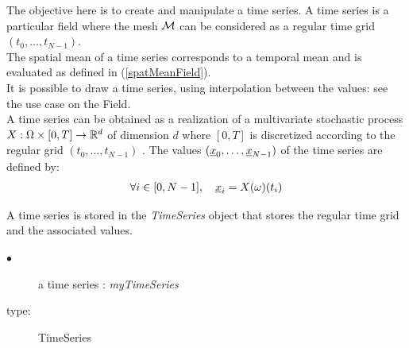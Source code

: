 \renewcommand{\filename}{docUC_TimeSeries.tex}
\renewcommand{\filetitle}{UC : Manipulation of a time series}

\HeaderIILevel

\label{UCtimeSeries}



The objective here is to create and manipulate a time series. A time series is a particular field where the mesh ${\mathcal M}$ can be considered as a regular time grid  $(t_0, \dots, t_{N-1})$.\\

The spatial mean of a time series corresponds to a temporal mean and is evaluated as  defined in (\ref{spatMeanField}). \\

It is possible to draw a time series, using interpolation between the values: see the use case on the Field.\\

A  time series can be obtained as a realization of a multivariate stochastic process  $X: \Omega \times [0,T] \rightarrow {\mathbb R}^d$   of dimension $d$ where $[0,T]$ is discretized according to the regular grid $(t_0, \dots, t_{N-1})$ . The  values $({\underline{x}}_0, \dots, {\underline{x}}_{N-1})$ of the  time series are defined by:
\begin{align}
  \forall i \in [0, N-1],\quad   {\underline{x}}_i= X(\omega)(t_i)
\end{align}

A time series is stored in the \emph{TimeSeries} object that stores the regular time grid and the associated values.\\



{
  \begin{description}
  \item[$\bullet$] a time series : {\itshape myTimeSeries}
  \item[type:]  TimeSeries
  \end{description}
}

